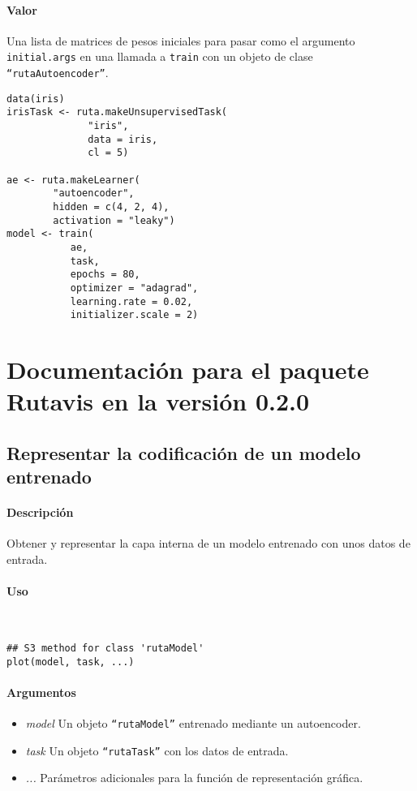\paragraph{Valor}
Una lista de matrices de pesos iniciales para pasar como el argumento \texttt{initial.args} en una llamada a \texttt{train} con un objeto de clase \texttt{``rutaAutoencoder''}.

\begin{lstlisting}
data(iris)
irisTask <- ruta.makeUnsupervisedTask(
              "iris",
              data = iris,
              cl = 5)

ae <- ruta.makeLearner(
        "autoencoder",
        hidden = c(4, 2, 4),
        activation = "leaky")
model <- train(
           ae,
           task,
           epochs = 80,
           optimizer = "adagrad",
           learning.rate = 0.02,
           initializer.scale = 2)         
\end{lstlisting}

\section{Documentación para el paquete Rutavis en la versión 0.2.0}

\subsection{Representar la codificación de un modelo entrenado}

\paragraph{Descripción}
Obtener y representar la capa interna de un modelo entrenado con unos datos de entrada.

\paragraph{Uso}
~

\begin{lstlisting}
## S3 method for class 'rutaModel'
plot(model, task, ...)
\end{lstlisting}

\paragraph{Argumentos}
\begin{itemize}
\item \emph{model}	Un objeto \texttt{``rutaModel''} entrenado mediante un autoencoder.
\item \emph{task}	Un objeto \texttt{``rutaTask''} con los datos de entrada.
\item \emph{...}	Parámetros adicionales para la función de representación gráfica.
\end{itemize}

